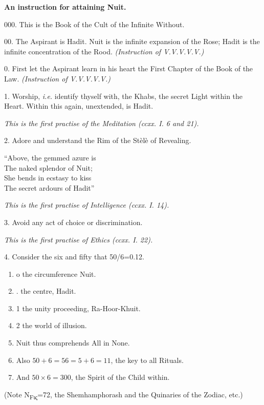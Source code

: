 
\textbf{An instruction for attaining Nuit.}

000. This is the Book of the Cult of the Infinite Without.

00. The Aspirant is Hadit. Nuit is the infinite expansion of the Rose; Hadit is the infinite concentration of the Rood. \textit{(Instruction of V.V.V.V.V.)}

0. First let the Aspirant learn in his heart the First Chapter of the Book of the Law. \textit{(Instruction of V.V.V.V.V.)}

1. Worship, \textit{i.e.} identify thyself with, the Khabs, the secret Light within the Heart. Within this again, unextended, is Hadit.

\textit{This is the first practise of the Meditation (ccxx. I. 6 and 21).}

2. Adore and understand the Rim of the St\`{e}l\`{e} of Revealing.
\begin{quoting}[indentfirst=false]
\enquote{Above, the gemmed azure is \\
The naked splendor of Nuit; \\
She bends in ecstasy to kiss \\
The secret ardours of Hadit}
\end{quoting}

\textit{This is the first practise of Intelligence (ccxx. I. 14).}

3. Avoid any act of choice or discrimination.

\textit{This is the first practise of Ethics (ccxx. I. 22).}

4. Consider the six and fifty that 50/6=0.12. \begin{enumerate}[label={}]
\item o the circumference Nuit.
\item . the centre, Hadit.
\item 1 the unity proceeding, Ra-Hoor-Khuit.
\item 2 the world of illusion.
\item Nuit thus comprehends All in None. 
\item Also $50 + 6 = 56 = 5 + 6 = 11$, the key to all Rituals. 
\item And $50 \times 6 = 300$, the Spirit of the Child within.
\end{enumerate}

(Note Ν\textsubscript{Fις}=72, the Shemhamphorash and the Quinaries of the Zodiac, etc.)

